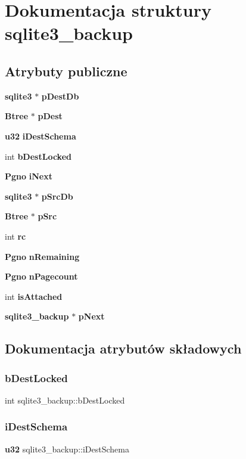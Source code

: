 \section{Dokumentacja struktury sqlite3\+\_\+backup}
\label{structsqlite3__backup}
\subsection*{Atrybuty publiczne}
\begin{DoxyCompactItemize}
\item 
\textbf{ sqlite3} $\ast$ \textbf{ p\+Dest\+Db}
\item 
\textbf{ Btree} $\ast$ \textbf{ p\+Dest}
\item 
\textbf{ u32} \textbf{ i\+Dest\+Schema}
\item 
int \textbf{ b\+Dest\+Locked}
\item 
\textbf{ Pgno} \textbf{ i\+Next}
\item 
\textbf{ sqlite3} $\ast$ \textbf{ p\+Src\+Db}
\item 
\textbf{ Btree} $\ast$ \textbf{ p\+Src}
\item 
int \textbf{ rc}
\item 
\textbf{ Pgno} \textbf{ n\+Remaining}
\item 
\textbf{ Pgno} \textbf{ n\+Pagecount}
\item 
int \textbf{ is\+Attached}
\item 
\textbf{ sqlite3\+\_\+backup} $\ast$ \textbf{ p\+Next}
\end{DoxyCompactItemize}


\subsection{Dokumentacja atrybutów składowych}
\mbox{\label{structsqlite3__backup_aa0d385678bc5c3fd4da4201ff03a5856}} 
\subsubsection{bDestLocked}
{\footnotesize\ttfamily int sqlite3\+\_\+backup\+::b\+Dest\+Locked}

\mbox{\label{structsqlite3__backup_a3f294f50b4ef206452dddd14f2a7cf6a}} 
\subsubsection{iDestSchema}
{\footnotesize\ttfamily \textbf{ u32} sqlite3\+\_\+backup\+::i\+Dest\+Schema}

